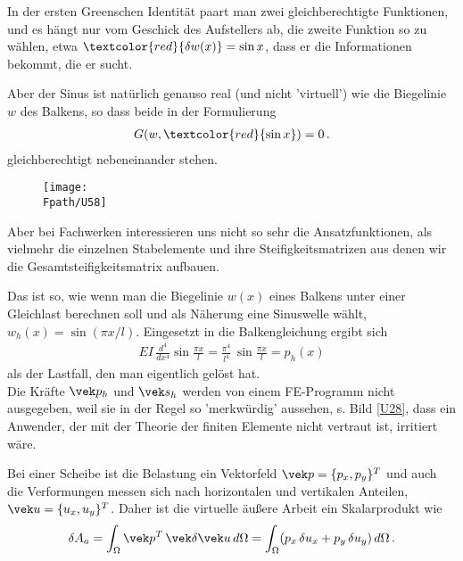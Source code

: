 {In der ersten Greenschen Identit\"{a}t paart man zwei gleichberechtigte Funktionen, und es h\"{a}ngt nur vom Geschick des Aufstellers ab, die zweite Funktion so zu w\"{a}hlen,
etwa $\textcolor{red}{\delta w(x)}= \sin x$, dass er die Informationen bekommt, die er sucht.

Aber der Sinus ist nat\"{u}rlich genauso real (und nicht 'virtuell') wie die Biegelinie $w$ des Balkens, so dass beide in der Formulierung
\begin{align}
G(w,\textcolor{red}{\sin x}) = 0\,.
\end{align}
gleichberechtigt nebeneinander stehen.

\begin{figure}[tbp]
\texttt{[image: \\Fpath/U58]}
\end{figure}%

Aber bei Fachwerken interessieren uns nicht so sehr die Ansatzfunktionen, als vielmehr die einzelnen Stabelemente und ihre Steifigkeitsmatrizen aus denen wir die Gesamtsteifigkeitsmatrix aufbauen.


Das ist so, wie wenn man die Biegelinie $w(x)$ eines Balkens unter einer Gleichlast berechnen soll und als N\"{a}herung eine Sinuswelle w\"{a}hlt, $w_h(x) = \sin (\pi x/l)$. Eingesetzt in die Balkengleichung ergibt sich
\begin{align}
EI\,\frac{d^4}{dx^4} \sin \frac{\pi x}{l} = \frac{\pi^4}{l^4}\,\sin \frac{\pi x}{l} = p_h(x)
\end{align}
als der Lastfall, den man eigentlich gel\"{o}st hat.
\\
Die Kr\"{a}fte $\vek p_h$ und $\vek s_h$ werden von einem FE-Programm nicht ausgegeben, weil sie in der Regel so 'merkw\"{u}rdig' aussehen, s. Bild  \ref{U28}, dass ein Anwender, der mit der Theorie der finiten Elemente nicht vertraut ist, irritiert w\"{a}re.\\

\begin{remark}
Bei einer Scheibe ist die Belastung ein Vektorfeld $\vek p = \{p_x,p_y\}^T$ und auch die Verformungen messen sich nach horizontalen und vertikalen Anteilen, $\vek u = \{u_x, u_y\}^T$. Daher ist die virtuelle \"{a}u{\ss}ere Arbeit ein Skalarprodukt wie
\begin{align}
\delta A_a = \int_{\Omega} \vek p^T\,\vek  \delta \vek u \,d\Omega = \int_{\Omega} (p_x\,\delta u_x + p_y\,\delta u_y)\,d\Omega\,.
\end{align}
\end{remark}


}
